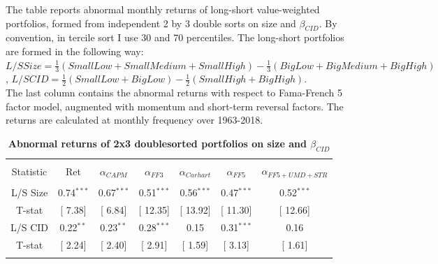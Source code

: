 \documentclass[12pt]{article}
\begin{document}
\begin{table}[!htbp] \centering 
  \caption{\textbf{Abnormal returns of 2x3 doublesorted portfolios on size and $\beta_{CID}$}}
  \label{} 
  \begin{flushleft}
    {\medskip\small
 The table reports abnormal monthly returns of long-short value-weighted portfolios, formed from independent 2 by 3 double sorts on size and $\beta_{CID}$. By convention, in tercile sort I use 30 and 70 percentiles. The long-short portfolios are formed in the following way:
 $L/S Size = \frac{1}{3}(SmallLow+SmallMedium+SmallHigh) - \frac{1}{3}(BigLow+BigMedium+BigHigh)$,
 $L/S CID = \frac{1}{2}(SmallLow+BigLow) - \frac{1}{2}(SmallHigh+BigHigh)$. \\
 The last column contains the abnormal returns with respect to Fama-French 5 factor model, augmented with momentum and short-term reversal factors. The returns are calculated at monthly frequency over 1963-2018.}
    \medskip
    \end{flushleft}
\begin{tabular}{@{\extracolsep{5pt}} ccccccc} 
\\[-1.8ex]\hline 
\hline \\[-1.8ex] 
Statistic & Ret & $\alpha_{CAPM}$ & $\alpha_{FF3}$ & $\alpha_{Carhart}$ & $\alpha_{FF5}$ & $\alpha_{FF5+UMD+STR}$ \\ 
\hline \\[-1.8ex] 
L/S Size & 0.74$^{***}$ & 0.67$^{***}$ & 0.51$^{***}$ & 0.56$^{***}$ & 0.47$^{***}$ & 0.52$^{***}$ \\ 
T-stat & [ 7.38] & [ 6.84] & [ 12.35] & [ 13.92] & [ 11.30] & [ 12.66] \\ 
L/S CID & 0.22$^{**}$ & 0.23$^{**}$ & 0.28$^{***}$ & 0.15 & 0.31$^{***}$ & 0.16 \\ 
T-stat & [ 2.24] & [ 2.40] & [ 2.91] & [ 1.59] & [ 3.13] & [ 1.61] \\ 
\hline \\[-1.8ex] 
\end{tabular} 
\end{table}
\end{document}
